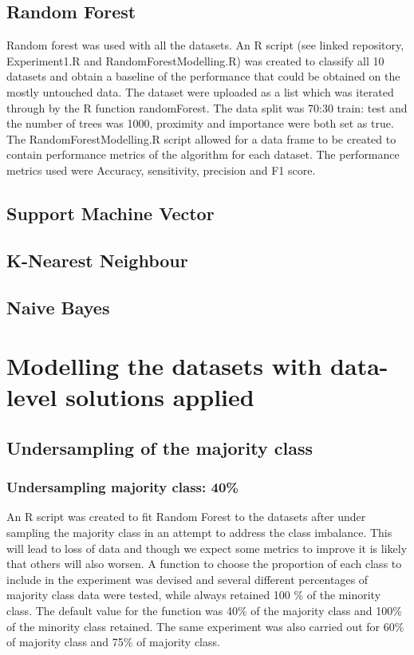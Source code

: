 \subsection{Random Forest}
Random forest was used with all the datasets. An R script (see linked repository, Experiment1.R and RandomForestModelling.R) was created to classify all 10 datasets and obtain a baseline of the performance that could be obtained on the mostly untouched data.
The dataset were uploaded as a list which was iterated through by the R function randomForest. The data split was 70:30 train: test and the number of trees was 1000, proximity and importance were both set as true.\newline
The RandomForestModelling.R script allowed for a data frame to be created to contain performance metrics of the algorithm for each dataset.\newline
The performance metrics used were Accuracy, sensitivity, precision and F1 score.\newline

\subsection{Support Machine Vector}
\subsection{K-Nearest Neighbour}
\subsection{Naive  Bayes}
\section{Modelling the datasets with data-level solutions applied}
\subsection{Undersampling of the majority class}
\subsubsection{Undersampling majority class: 40\%}
An R script was created to fit Random Forest to the datasets after under sampling the majority class in an attempt to address the class imbalance. This will lead to loss of data and though we expect some metrics to improve it is likely that others will also worsen.\newline
A function to choose the proportion of each class to include in the experiment was devised and several different percentages of majority class data were tested, while always retained 100 \% of the minority class.  The default value for the function was 40\% of the majority class and 100\% of the minority class retained. The same experiment was also carried out for 60\% of majority class and 75\% of majority class.\newline

